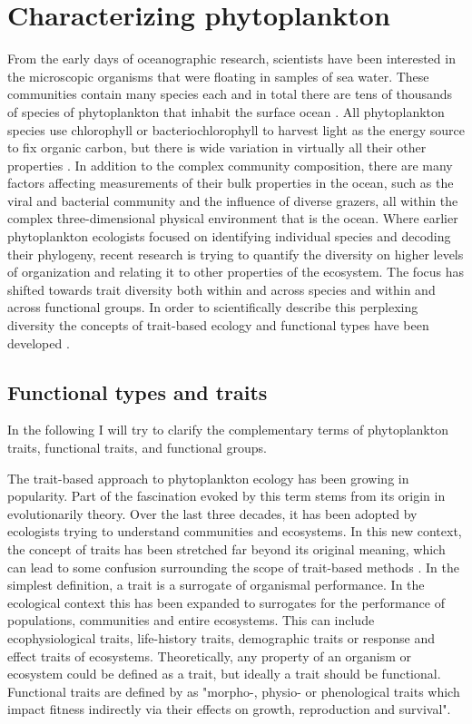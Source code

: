 \section{Characterizing phytoplankton}
From the early days of oceanographic research, scientists have been interested in the microscopic organisms that were floating in samples of sea water. These communities contain many species each and in total there are tens of thousands of species of phytoplankton that inhabit the surface ocean \citep{Engelen2015}. All phytoplankton species use chlorophyll or bacteriochlorophyll to harvest light as the energy source to fix organic carbon, but there is wide variation in virtually all their other properties \citep{Litchman2008}. In addition to the complex community composition, there are many factors affecting measurements of their bulk properties in the ocean, such as the viral and bacterial community and the influence of diverse grazers, all within the complex three-dimensional physical environment that is the ocean. Where earlier phytoplankton ecologists focused on identifying individual species and decoding their phylogeny, recent research is trying to quantify the diversity on higher levels of organization and relating it to other properties of the ecosystem. The focus has shifted towards trait diversity both within and across species and within and across functional groups. In order to scientifically describe this perplexing diversity the concepts of trait-based ecology and functional types have been developed \citep{Tilman2001,McGill2006,Violle2007c}.

\subsection{Functional types and traits}
In the following I will try to clarify the complementary terms of phytoplankton traits, functional traits, and functional groups. 

The trait-based approach to phytoplankton ecology has been growing in popularity. Part of the fascination evoked by this term stems from its origin in evolutionarily theory. Over the last three decades, it has been adopted by ecologists trying to understand communities and ecosystems. In this new context, the concept of traits has been stretched far beyond its original meaning, which can lead to some confusion surrounding the scope of trait-based methods \citep{Violle2007c}. In the simplest definition, a trait is a surrogate of organismal performance. In the ecological context this has been expanded to surrogates for the performance of populations, communities and entire ecosystems. This can include ecophysiological traits, life-history traits, demographic traits or response and effect traits of ecosystems. Theoretically, any property of an organism or ecosystem could be defined as a trait, but ideally a trait should be functional. Functional traits are defined by \cite{Violle2007c} as "morpho-, physio- or phenological traits which impact fitness indirectly via their effects on growth, reproduction and survival". 

